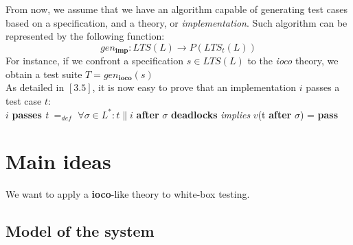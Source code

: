 \documentclass[a4paper]{report}
\begin{document}
From now, we assume that we have an algorithm capable of generating test cases based on a specification, and a theory, or \textit{implementation}. Such algorithm can be represented by the following function:
\[ gen_{\textbf{imp}}: LTS(L) \rightarrow P(LTS_t(L)) \]
For instance, if we confront a specification $s \in LTS(L)$ to the \textit{ioco} theory, we obtain a test suite $T = gen_{\textbf{ioco}}(s)$\\
\newline
As detailed in $[3.5]$, it is now easy to prove that an implementation $i$ passes a test case $t$:\\
$i$ \textbf{passes} \textit{t} $=_{def}$ $\forall \sigma \in L^* : t \| i$ \textbf{after} $\sigma$ \textbf{deadlocks} \textit{implies} $v$(t \textbf{after} $\sigma$) = \textbf{pass}\\


\chapter*{Main ideas}
We want to apply a \textbf{ioco}-like theory to white-box testing.
\section*{Model of the system}
\end{document}
